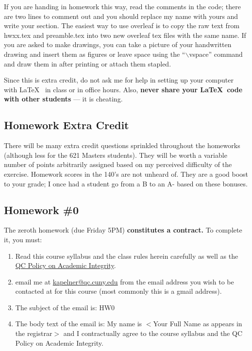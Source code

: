 \documentclass[12pt]{article}
\newcommand{\inred}[1]{\color{red}\textbf{#1} \color{black}}
\newcommand{\qu}[1]{``#1''}
\begin{document}
If you are handing in homework this way, read the comments in the code; there are two lines to comment out and you should replace my name with yours and write your section. The easiest way to use overleaf is to copy the raw text from hwxx.tex and preamble.tex into two new overleaf tex files with the same name. If you are asked to make drawings, you can take a picture of your handwritten drawing and insert them as figures or leave space using the \qu{$\backslash$vspace} command and draw them in after printing or attach them stapled.

Since this is extra credit, do not ask me for help in setting up your computer with \LaTeX~ in class or in office hours. Also, \textbf{never share your \LaTeX~code with other students} --- it is cheating.

\subsection*{Homework Extra Credit}

There will be many extra credit questions sprinkled throughout the homeworks (although less for the 621 Masters students). They will be worth a variable number of points arbitrarily assigned based on my perceived difficulty of the exercise. Homework scores in the 140's are not unheard of. They are a good boost to your grade; I once had a student go from a B to an A- based on these bonuses.

\subsection*{Homework \#0}

The zeroth homework (due Friday 5PM) \inred{constitutes a contract.} To complete it, you must:

\begin{enumerate}[(1)]
\item Read this course syllabus and the class rules herein carefully as well as the \href{https://www.qc.cuny.edu/StudentLife/services/studev/Documents/Academic%20Integrity%20Violation%20Form%20RV.pdf}{QC Policy on Academic Integrity}.
\item email me at \href{kapelner@qc.cuny.edu}{kapelner@qc.cuny.edu} from the email address you wish to be contacted at for this course (most commonly this is a gmail address).
\item The subject of the email is: HW0
\item The body text of the email is: My name is $<$Your Full Name as appears in the registrar$>$ and I contractually agree to the course syllabus and the QC Policy on Academic Integrity.
\end{enumerate}
\end{document}
